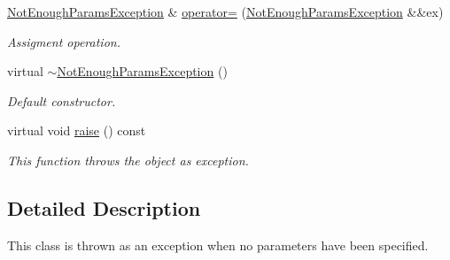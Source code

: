 \begin{DoxyCompactItemize}
\hyperlink{class_dynamic_fast_buffers_1_1_not_enough_params_exception}{Not\-Enough\-Params\-Exception} \& \hyperlink{class_dynamic_fast_buffers_1_1_not_enough_params_exception_a48ddab211926fd7001886e3d3487b379}{operator=} (\hyperlink{class_dynamic_fast_buffers_1_1_not_enough_params_exception}{Not\-Enough\-Params\-Exception} \&\&ex)
\begin{DoxyCompactList}\small\item\em Assigment operation. \end{DoxyCompactList}\item 
\hypertarget{class_dynamic_fast_buffers_1_1_not_enough_params_exception_a6e6deac28b4ead1cc6dfd9df0af9ab79}{virtual \hyperlink{class_dynamic_fast_buffers_1_1_not_enough_params_exception_a6e6deac28b4ead1cc6dfd9df0af9ab79}{$\sim$\-Not\-Enough\-Params\-Exception} ()}\label{class_dynamic_fast_buffers_1_1_not_enough_params_exception_a6e6deac28b4ead1cc6dfd9df0af9ab79}

\begin{DoxyCompactList}\small\item\em Default constructor. \end{DoxyCompactList}\item 
\hypertarget{class_dynamic_fast_buffers_1_1_not_enough_params_exception_afd137902cbde0e8e81b804d29f903b48}{virtual void \hyperlink{class_dynamic_fast_buffers_1_1_not_enough_params_exception_afd137902cbde0e8e81b804d29f903b48}{raise} () const }\label{class_dynamic_fast_buffers_1_1_not_enough_params_exception_afd137902cbde0e8e81b804d29f903b48}

\begin{DoxyCompactList}\small\item\em This function throws the object as exception. \end{DoxyCompactList}\end{DoxyCompactItemize}


\subsection{Detailed Description}
This class is thrown as an exception when no parameters have been specified. 

